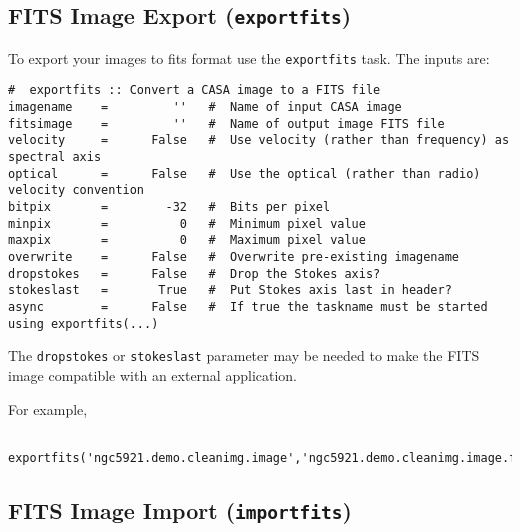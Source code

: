 \subsection{FITS Image Export ({\tt exportfits})}
\label{section:analysis.fits.export}

To export your images to fits format use the {\tt exportfits} task.
The inputs are:
\small
\begin{verbatim}
#  exportfits :: Convert a CASA image to a FITS file
imagename    =         ''   #  Name of input CASA image
fitsimage    =         ''   #  Name of output image FITS file
velocity     =      False   #  Use velocity (rather than frequency) as spectral axis
optical      =      False   #  Use the optical (rather than radio) velocity convention
bitpix       =        -32   #  Bits per pixel
minpix       =          0   #  Minimum pixel value
maxpix       =          0   #  Maximum pixel value
overwrite    =      False   #  Overwrite pre-existing imagename
dropstokes   =      False   #  Drop the Stokes axis?
stokeslast   =       True   #  Put Stokes axis last in header?
async        =      False   #  If true the taskname must be started using exportfits(...)
\end{verbatim}
\normalsize

The {\tt dropstokes} or {\tt stokeslast} parameter may be needed to
make the FITS image compatible with an external application.

For example,
\small
\begin{verbatim}
   exportfits('ngc5921.demo.cleanimg.image','ngc5921.demo.cleanimg.image.fits')
\end{verbatim}
\normalsize


\subsection{FITS Image Import ({\tt importfits})}
\label{section:analysis.fits.import}

